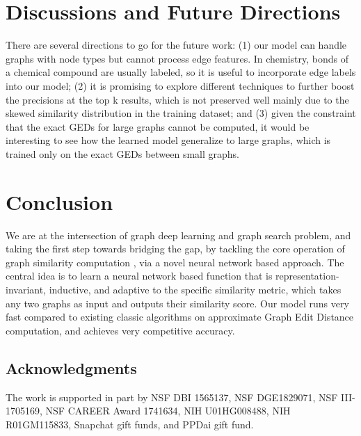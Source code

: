 \documentclass[sigconf]{acmart}
\begin{document}
 \section{Discussions and Future Directions}
\label{sec-future}
There are several directions to go for the future work: (1) our model can handle graphs with node types but cannot process edge features. In chemistry, bonds of a chemical compound are usually labeled, so it is useful to incorporate edge labels into our model;
(2) it is promising to explore different techniques to further boost the precisions at the top k results, which is not preserved well mainly due to the skewed similarity distribution in the training dataset; and (3) given the constraint that the exact GEDs for large graphs cannot be computed, it would be interesting to see how the learned model generalize to large graphs, which is trained only on the exact GEDs between small graphs. \section{Conclusion}
We are at the intersection of graph deep learning and graph search problem, and taking the first step towards bridging the gap, by tackling the core operation of graph similarity computation
, via a novel neural network based approach. The central idea is to learn a neural network based function that is representation-invariant, inductive, and adaptive to the specific similarity metric, which takes any two graphs as input and outputs their similarity score. Our model runs very fast compared to existing classic algorithms on approximate Graph Edit Distance computation, and achieves very competitive accuracy.
\label{sec-conc} 
\subsection*{Acknowledgments}

The work is supported in part by NSF DBI 1565137, NSF DGE1829071, NSF III-1705169, NSF CAREER Award 1741634, NIH U01HG008488, NIH R01GM115833, Snapchat gift funds, and PPDai gift fund.



\end{document}
